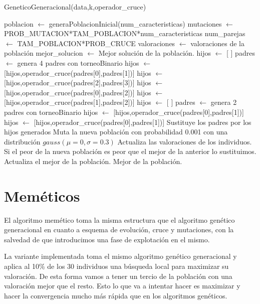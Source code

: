\documentclass[12pt,a4paper]{article}
\begin{document}
	\begin{algorithm}
		\caption{GeneticoGeneracional(data,k,operador\_cruce)}
		\begin{algorithmic}
			\STATE poblacion $\leftarrow$ generaPoblacionInicial(num\_caracteristicas)
			\STATE mutaciones $\leftarrow$ PROB\_MUTACION*TAM\_POBLACION*num\_caracteristicas
			\STATE num\_parejas $\leftarrow$ TAM\_POBLACION*PROB\_CRUCE
			\STATE valoraciones $\leftarrow$ valoraciones de la población
			\STATE mejor\_solucion $\leftarrow$ Mejor solución de la población.
						\STATE hijos $\leftarrow$ [ ]
						\STATE padres $\leftarrow$ genera 4 padres con torneoBinario
						\STATE hijos $\leftarrow$ [hijos,operador\_cruce(padres[0],padres[1])]
						\STATE hijos $\leftarrow$ [hijos,operador\_cruce(padres[2],padres[3])]
						\STATE hijos $\leftarrow$ [hijos,operador\_cruce(padres[0],padres[2])]
						\STATE hijos $\leftarrow$ [hijos,operador\_cruce(padres[1],padres[2])]
					\ELSE
						\STATE hijos $\leftarrow$ [ ]
						\STATE padres $\leftarrow$ genera 2 padres con torneoBinario
						\STATE hijos $\leftarrow$ [hijos,operador\_cruce(padres[0],padres[1])]
						\STATE hijos $\leftarrow$ [hijos,operador\_cruce(padres[0],padres[1])]
					\ENDIF
					\STATE Sustituye los padres por los hijos generados
				\ENDFOR
				\STATE Muta la nueva población con probabilidad 0.001 con una distribución $gauss(\mu=0,\sigma=0.3)$
				\STATE Actualiza las valoraciones de los individuos.
				\STATE Si el peor de la nueva población es peor que el mejor de la anterior lo sustituimos.
				\STATE Actualiza el mejor de la población.
			\ENDWHILE
			\RETURN Mejor de la población.
		\end{algorithmic}
	\end{algorithm}
		
	\section{Meméticos}
	\label{sec:memeticos}
	
	El algoritmo memético toma la misma estructura que el algoritmo genético generacional en cuanto a esquema de evolución, cruce y mutaciones, con la salvedad de que introducimos una fase de explotación en el mismo.
	
	La variante implementada toma el mismo algoritmo genético generacional y aplica al 10\% de los 30 individuos una búsqueda local para maximizar su valoración. De esta forma vamos a tener un tercio de la población con una valoración mejor que el resto. Esto lo que va a intentar hacer es maximizar y hacer la convergencia mucho más rápida que en los algoritmos genéticos.
	
\end{document}
